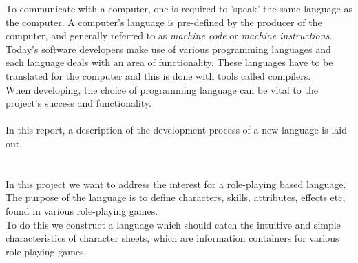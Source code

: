 
To communicate with a computer, one is required to 'speak' the same language as the computer. A computer's language is pre-defined by the producer of the computer, and generally referred to as \emph{machine code} or \emph{machine instructions}.\\
Today's software developers make use of various programming languages and each language deals with an area of functionality. These languages have to be translated for the computer and this is done with tools called compilers.\\
When developing, the choice of programming language can be vital to the project's success and functionality.\\\\
In this report, a description of the development-process of a new language is laid out.

\section{\langname{}}
In this project we want to address the interest for a role-playing based language. The purpose of the language is to define characters, skills, attributes, effects etc,  found in various role-playing games.\\
To do this we construct a language which should catch the intuitive and simple characteristics of character sheets, which are information containers for various role-playing games.

